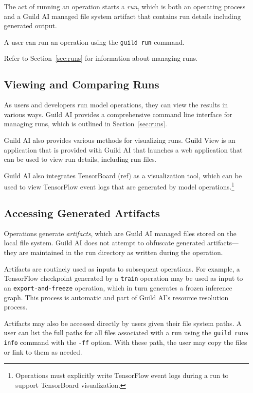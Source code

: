\documentclass{article}
\begin{document}
The act of running an operation starts a \emph{run}, which is both an
operating process and a Guild AI managed file system artifact that
contains run details including generated output.

A user can run an operation using the \verb|guild run| command.

Refer to Section~\ref{sec:runs} for information about managing runs.

\subsection{Viewing and Comparing Runs}

As users and developers run model operations, they can view the
results in various ways. Guild AI provides a comprehensive command
line interface for managing runs, which is outlined in
Section~\ref{sec:runs}.

Guild AI also provides various methods for visualizing runs. Guild
View is an application that is provided with Guild AI that launches a
web application that can be used to view run details, including run
files.

Guild AI also integrates TensorBoard (ref) as a visualization tool,
which can be used to view TensorFlow event logs that are generated by
model operations.\footnote{Operations must explicitly write TensorFlow
  event logs during a run to support TensorBoard visualization.}

\subsection{Accessing Generated Artifacts}

Operations generate \emph{artifacts}, which are Guild AI managed files
stored on the local file system. Guild AI does not attempt to
obfuscate generated artifacts---they are maintained in the run
directory as written during the operation.

Artifacts are routinely used as inputs to subsequent operations. For
example, a TensorFlow checkpoint generated by a \verb|train| operation
may be used as input to an \verb|export-and-freeze| operation, which
in turn generates a frozen inference graph. This process is automatic
and part of Guild AI's resource resolution process.

Artifacts may also be accessed directly by users given their file
system paths. A user can list the full paths for all files associated
with a run using the \verb|guild runs info| command with the
\verb|-ff| option. With these path, the user may copy the files or
link to them as needed.
\end{document}
